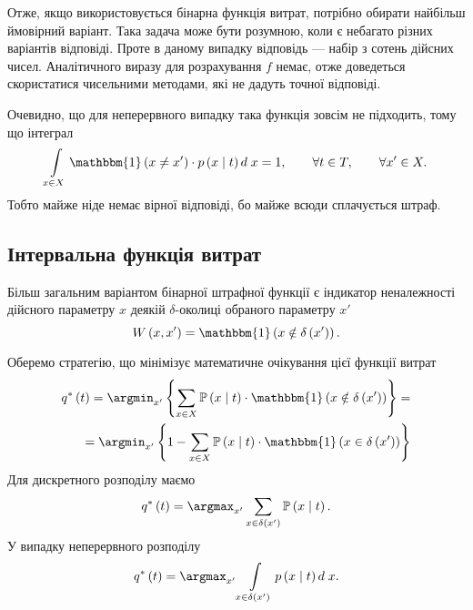 Отже, якщо використовується бінарна функція витрат,
потрібно обирати найбільш ймовірний варіант.
Така задача може бути розумною, коли є небагато різних варіантів відповіді.
Проте в даному випадку відповідь --- набір з сотень дійсних чисел.
Аналітичного виразу для розрахування $f$ немає,
отже доведеться скористатися чисельними методами,
які не дадуть точної відповіді.

Очевидно,
що для неперервного випадку така функція зовсім не підходить,
тому що інтеграл
\begin{equation*}
  \int\limits_{x \in X} \mathbbm{1} \left( x \neq x' \right)
  \cdot p\left( x \;\middle|\;  t \right) d\; x = 1,\qquad
  \forall t \in T,\qquad
  \forall x' \in X.
\end{equation*}
Тобто майже ніде немає вірної відповіді, бо майже всюди сплачується штраф.

\subsection{Інтервальна функція витрат}

Більш загальним варіантом бінарної штрафної функції є
індикатор неналежності дійсного параметру $x$
деякій $\delta$-околиці обраного параметру $x'$
\begin{equation*}
  W \left( x, x' \right)
  = \mathbbm{1} \left( x \notin \delta\left( x' \right) \right).
\end{equation*}

Оберемо стратегію, що мінімізує математичне очікування цієї функції витрат
\begin{equation*}
  \begin{split}
    q^* \left( t \right)
    = \argmin_{x'} \left\{
      \sum\limits_{x \in X}
        \mathbb{P}\left( x \;\middle|\;  t \right)
        \cdot \mathbbm{1} \left( x \notin \delta\left( x' \right) \right)
      \right\} = \\
    = \argmin_{x'} \left\{
      1 -
      \sum\limits_{x \in X}
        \mathbb{P}\left( x \;\middle|\;  t \right)
        \cdot \mathbbm{1} \left( x \in \delta\left( x' \right) \right)
      \right\}
  \end{split}
\end{equation*}
Для дискретного розподілу маємо
\begin{equation*}
  q^* \left( t \right)
  = \argmax_{x'} \sum\limits_{x \in \delta\left( x' \right)}
    \mathbb{P}\left( x \;\middle|\;  t \right).
\end{equation*}
У випадку неперервного розподілу
\begin{equation*}
  q^* \left( t \right)
  = \argmax_{x'} \int\limits_{x \in \delta\left( x' \right)}
    p\left( x \;\middle|\;  t \right) d\; x.
\end{equation*}

